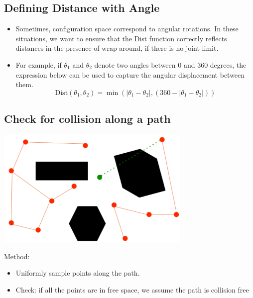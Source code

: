 \documentclass[10pt]{article}
\begin{document}
\subsection*{Defining Distance with Angle}
\begin{itemize}
	\item Sometimes, configuration space correspond to angular rotations.  In these situations, we want to ensure that the Dist function correctly reflects distances in the presence of wrap around, if there is no joint limit.
	\item For example, if $\theta_1$ and $\theta_2$ denote two angles between $0$ and $360$ degrees, the expression below can be used to capture the angular displacement between them.
	\[\text{Dist}(\theta_1, \theta_2) = \min(|\theta_1 - \theta_2|, (360 - |\theta_1 - \theta_2|))\]
\end{itemize}

\subsection*{Check for collision along a path}
\begin{center} 
    \includegraphics*[width=0.7\textwidth]{L1_9.png} 
\end{center}
Method:
\begin{itemize}
	\item Uniformly sample points along the path.
	\item Check: if all the points are in free space, we assume the path is collision free
\end{itemize}
\end{document}
